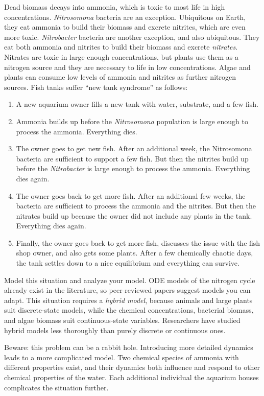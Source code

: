 \begin{modelingproject}
\item %
Dead biomass decays into ammonia, which is toxic to most life in high concentrations. \textit{Nitrosomona} bacteria are an exception. Ubiquitous on Earth, they eat ammonia to build their biomass and excrete nitrites, which are even more toxic. \textit{Nitrobacter} bacteria are another exception, and also ubiquitous. They eat both ammonia and nitrites to build their biomass and excrete \textit{nitrates}. Nitrates are toxic in large enough concentrations, but plants use them as a nitrogen source and they are necessary to life in low concentrations. Algae and plants can consume low levels of ammonia and nitrites as further nitrogen sources. Fish tanks suffer ``new tank syndrome'' as follows:
\begin{enumerate}
\item A new aquarium owner fills a new tank with water, substrate, and a few fish.
\item Ammonia builds up before the \textit{Nitrosomona} population is large enough to process the ammonia. Everything dies.
\item The owner goes to get new fish. After an additional week, the Nitrosomona bacteria are sufficient to support a few fish. But then the nitrites build up before the \textit{Nitrobacter} is large enough to process the ammonia. Everything dies again.
\item The owner goes back to get more fish. After an additional few weeks, the bacteria are sufficient to process the ammonia and the nitrites. But then the nitrates build up because the owner did not include any plants in the tank. Everything dies again.
\item Finally, the owner goes back to get more fish, discusses the issue with the fish shop owner, and also gets some plants. After a few chemically chaotic days, the tank settles down to a nice equilibrium and everything can survive.
\end{enumerate}
Model this situation and analyze your model. ODE models of the nitrogen cycle already exist in the literature, so peer-reviewed papers suggest models you can adapt. This situation requires a \textit{hybrid model}, because animals and large plants suit discrete-state models, while the chemical concentrations, bacterial biomass, and algae biomass suit continuous-state variables. Researchers have studied hybrid models less thoroughly than purely discrete or continuous ones.

Beware: this problem can be a rabbit hole. Introducing more detailed dynamics leads to a more complicated model. Two chemical species of ammonia with different properties exist, and their dynamics both influence and respond to other chemical properties of the water. Each additional individual the aquarium houses complicates the situation further.

\end{modelingproject}
